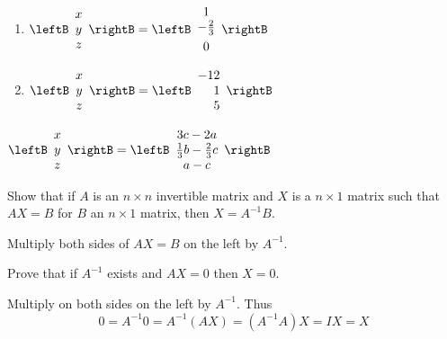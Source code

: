 \begin{enumialphparenastyle}
\begin{ex}
\begin{sol}
\begin{enumerate}
\item $\leftB
\begin{array}{c}
x \\
y \\
z
\end{array}
\rightB =\leftB
\begin{array}{c}
1 \\
-\vspace{0.05in}\frac{2}{3} \\
0
\end{array}
\rightB$
\item $\leftB
\begin{array}{c}
x \\
y \\
z
\end{array}
\rightB = \leftB
\begin{array}{r}
-12 \\
1 \\
5
\end{array}
\rightB$
\end{enumerate}

$\leftB
\begin{array}{c}
x \\
y \\
z
\end{array}
\rightB = 
\leftB
\begin{array}{c}
3c-2a \\
\frac{1}{3}b-\frac{2}{3}c \\
a-c
\end{array}
\rightB$
\end{sol}
\end{ex}

\begin{ex}Show that if $A$ is an $n\times n$ invertible matrix and $X$
is a $n\times 1$ matrix such that $AX=B$ for $B$ an 
$n\times 1$ matrix, then $X=A^{-1}B$. 
\begin{sol}
Multiply both sides of $AX=B$ on the left by $A^{-1}$.
\end{sol}
\end{ex}

\begin{ex}Prove that if $A^{-1}$ exists and $AX=0$ then $X=0$. 
\begin{sol}
Multiply on both sides on the left by $A^{-1}.$ Thus
\[
0=A^{-1}0=A^{-1}\left( AX\right) =\left(
A^{-1}A\right) X=IX = X
\]
\end{sol}
\end{ex}


\end{enumialphparenastyle}
